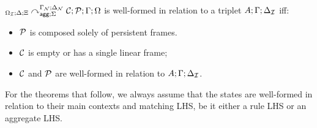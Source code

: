 \begin{definition}
${{}_{\Omega_{\mathcal{I}} ; \Delta ; \Xi}\curvearrowright}_{\mathsf{agg} ; \Sigma}^{\Gamma_{\mathcal{N}}; \Delta_{\mathcal{N}}} \; \mathcal{C};
      \mathcal{P} ; \Gamma ; \Omega$
is well-formed in relation to a triplet $A; \Gamma; \Delta_{\mathcal{I}}$ iff:

\begin{itemize}[leftmargin=*]
   \item $\mathcal{P}$ is composed solely of persistent frames.
   \item $\mathcal{C}$ is empty or has a single linear frame;
   \item $\mathcal{C}$ and $\mathcal{P}$ are well-formed in relation to $A; \Gamma; \Delta_{\mathcal{I}}$.
\end{itemize}

\end{definition}

For the theorems that follow, we always assume that the states are
well-formed in relation to their main contexts and matching LHS, be it either a
rule LHS or an aggregate LHS.


